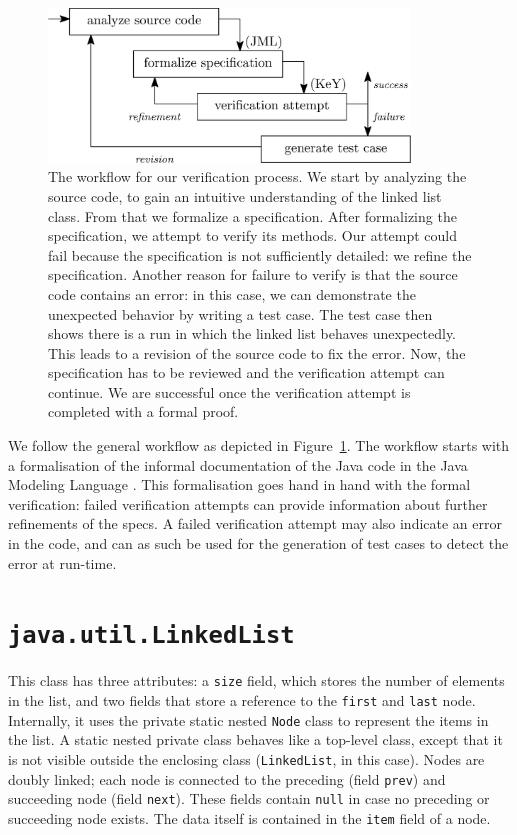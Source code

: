 \documentclass[runningheads]{llncs}
\begin{document}
\begin{figure}
    \centering
    \includegraphics[width=272pt]{figures/workflow.eps}
    \caption{The workflow for our verification process. We start by analyzing the source code, to gain an intuitive understanding of the linked list class. From that we formalize a specification. After formalizing the specification, we attempt to verify its methods. Our attempt could fail because the specification is not sufficiently detailed: we refine the specification. Another reason for failure to verify is that the source code contains an error: in this case, we can demonstrate the unexpected behavior by writing a test case. The test case then shows there is a run in which the linked list behaves unexpectedly. This leads to a revision of the source code to fix the error. Now, the specification has to be reviewed and the verification attempt can continue. We are successful once the verification attempt is completed with a formal proof.}
    \label{fig:workflow}
\end{figure}

We follow the general workflow as depicted in Figure~\ref{fig:workflow}. The workflow starts with a formalisation of the informal documentation of the Java code in the Java Modeling Language \cite{LeavensBR99}. %
This formalisation goes hand in hand with the formal verification: failed verification attempts can provide information about
further refinements of the specs. A failed verification attempt may also indicate an error in the code,
and can as such be used for the generation of test cases to detect the error at run-time.

\section{\texttt{java.util.LinkedList}}\label{sec:linkedlist}

This class has three attributes: a \texttt{size} field, which stores the number of elements in the list, and two
fields that store a reference to the \texttt{first} and \texttt{last} node. Internally, it uses the private static nested \texttt{Node} class to represent the items in the list. A static nested private class behaves like a top-level class, except that it is not visible outside the enclosing class (\texttt{LinkedList}, in this case). Nodes are doubly linked; each node is connected to the preceding (field \texttt{prev}) and succeeding node (field \texttt{next}). These fields contain \texttt{null} in case no preceding or succeeding node exists. The data itself is contained in the \texttt{item} field of a node.
\end{document}
